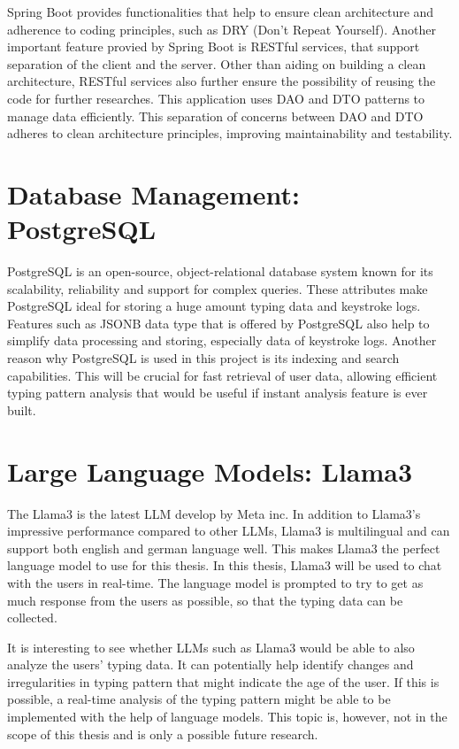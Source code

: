 Spring Boot provides functionalities that help to ensure clean architecture and adherence to coding principles, such as DRY (Don't Repeat Yourself).
Another important feature provied by Spring Boot is RESTful services, that support separation of the client and the server.
Other than aiding on building a clean architecture, RESTful services also further ensure the possibility of reusing the code for further researches.
This application uses \ac{DAO} and \ac{DTO} patterns to manage data efficiently.
This separation of concerns between \ac{DAO} and \ac{DTO} adheres to clean architecture principles, improving maintainability and testability.

\section{Database Management: PostgreSQL}
PostgreSQL is an open-source, object-relational database system known for its scalability, reliability and support for complex queries.
These attributes make PostgreSQL ideal for storing a huge amount typing data and keystroke logs.
Features such as JSONB data type that is offered by PostgreSQL also help to simplify data processing and storing, especially data of keystroke logs. 
Another reason why PostgreSQL is used in this project is its indexing and search capabilities.
This will be crucial for fast retrieval of user data, allowing efficient typing pattern analysis that would be useful if instant analysis feature is ever built.

\section{Large Language Models: Llama3}
The Llama3 is the latest \ac{LLM} develop by Meta inc.
In addition to Llama3's impressive performance compared to other \ac{LLM}s, Llama3 is multilingual and can support both english and german language well.
This makes Llama3 the perfect language model to use for this thesis.
In this thesis, Llama3 will be used to chat with the users in real-time.
The language model is prompted to try to get as much response from the users as possible, so that the typing data can be collected.

It is interesting to see whether \ac{LLM}s such as Llama3 would be able to also analyze the users' typing data.
It can potentially help identify changes and irregularities in typing pattern that might indicate the age of the user.
If this is possible, a real-time analysis of the typing pattern might be able to be implemented with the help of language models.
This topic is, however, not in the scope of this thesis and is only a possible future research.

